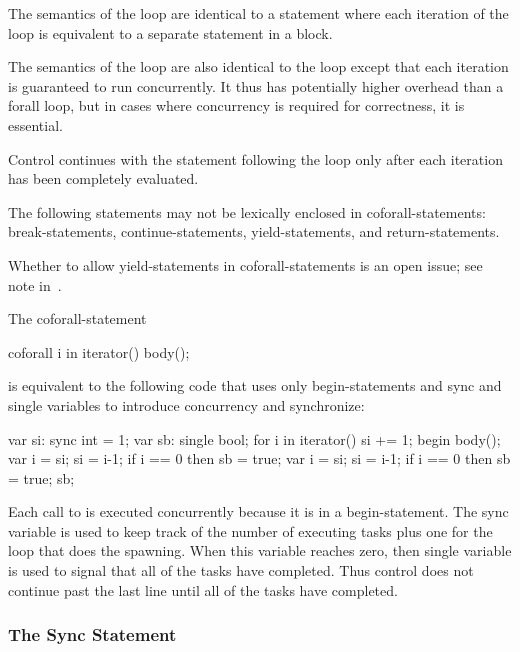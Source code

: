 The semantics of the  loop are identical to
a  statement where each iteration of the 
loop is equivalent to a separate statement in a  block.

The semantics of the  loop are also identical to
the  loop except that each iteration is guaranteed to run
concurrently.  It thus has potentially higher overhead than a forall
loop, but in cases where concurrency is required for correctness, it
is essential.

Control continues with the statement following the 
loop only after each iteration has been completely evaluated.

The following statements may not be lexically enclosed in
coforall-statements: break-statements, continue-statements,
yield-statements, and return-statements.

\begin{openissue}
Whether to allow yield-statements in coforall-statements is an open
issue; see note in~.
\end{openissue}

\begin{example}
The coforall-statement
\begin{chapel}
coforall i in iterator() {
  body();
}
\end{chapel}
is equivalent to the following code that uses only begin-statements
and sync and single variables to introduce concurrency and
synchronize:
\begin{chapel}
var si: sync int = 1;
var sb: single bool;
for i in iterator() {
  si += 1;
  begin {
    body();
    var i = si;
    si = i-1;
    if i == 0 then sb = true;
  }
}
var i = si;
si = i-1;
if i == 0 then sb = true;
sb;
\end{chapel}
Each call to  is executed concurrently because it is in a
begin-statement.  The sync variable  is used to keep track of
the number of executing tasks plus one for the loop that does the
spawning.  When this variable reaches zero, then single variable is
used to signal that all of the tasks have completed.  Thus control
does not continue past the last line until all of the tasks have
completed.
\end{example}

\subsubsection{The Sync Statement}
\label{Sync_Statement}

